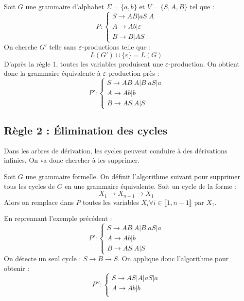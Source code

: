 \begin{example}
    Soit $G$ une grammaire d'alphabet $\Sigma = \{a,b\}$ et $V = \{S,A,B\}$ tel que :
        \[ P : 
            \begin{cases}
                S \longrightarrow AB | aS | A \\ 
                A \longrightarrow Ab | \varepsilon \\ 
                B \longrightarrow B | AS 
            \end{cases}
        \] 
    On cherche $G'$ telle sans $\varepsilon$-productions telle que :
        \[ L(G') \cup \{\varepsilon\} = L(G) \] 
    D'après la règle 1, toutes les variables produisent une $\varepsilon$-production. 
    On obtient donc la grammaire équivalente à $\varepsilon$-production près :
        \[ P' : 
            \begin{cases}
                S \longrightarrow AB | A | B | aS | a \\ 
                A \longrightarrow Ab | b \\ 
                B \longrightarrow AS | A | S 
            \end{cases} \] 
\end{example}



\subsection{Règle 2 : Élimination des cycles}

Dans les arbres de dérivation, les cycles peuveut conduire à des dérivations infinies. 
On va donc chercher à les supprimer. 

\begin{definition}
    Soit $G$ une grammaire formelle. On définit l'algorithme suivant pour 
    supprimer tous les cycles de $ G$ en une grammaire équivalente. 
    Soit un cycle de la forme : 
        \[ X_1 \longrightarrow X_{n-1} \longrightarrow X_1 \] 
    Alors on remplace dans $P$ toutes les variables $X_i \forall i \in \llbracket 1, n-1 \rrbracket$ 
    par $X_1$. 
\end{definition}

\begin{example}
    En reprennant l'exemple précédent : 
    \[ P' : 
            \begin{cases}
                S \longrightarrow AB | A | B | aS | a \\ 
                A \longrightarrow Ab | b \\ 
                B \longrightarrow AS | A | S 
            \end{cases} \] 
    On détecte un seul cycle : $ S \longrightarrow B \longrightarrow S$. 
    On applique donc l'algorithme pour obtenir : 
    \[ P'' : 
            \begin{cases}
                S \longrightarrow AS | A | aS | a \\ 
                A \longrightarrow Ab | b \\ 
            \end{cases} \] 
\end{example}

